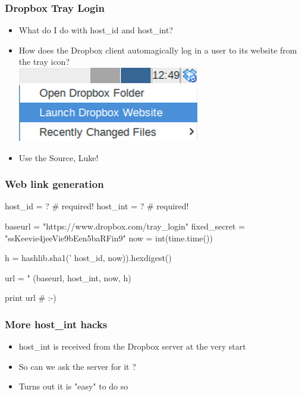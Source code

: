 \documentclass{beamer}
\newcommand\myfont{\fontsize{14}{20}\selectfont}
\begin{document}
\begin{frame}
\frametitle{Dropbox Tray Login}
\myfont
\begin{itemize}
\itemsep 2em
\item What do I do with host\_id and host\_int?
\item How does the Dropbox client automagically log in a user to its website from the tray icon? \\
\vspace{1em} \includegraphics[scale=0.5]{dbicon.png}
\item Use the Source, Luke!
\end{itemize}
\end{frame}

\begin{frame}[fragile]
\frametitle{Web link generation}
\begin{python}
host_id = ?   # required!
host_int = ?  # required!

baseurl = "https://www.dropbox.com/tray_login"
fixed_secret = "ssKeevie4jeeVie9bEen5baRFin9"
now = int(time.time())

h = hashlib.sha1('%
       host_id, now)).hexdigest()

url = "%
        (baseurl, host_int, now, h)

print url # :-)
\end{python}
\end{frame}

\begin{frame}
\frametitle{More host\_int hacks}
\myfont
\begin{itemize}
\itemsep 3em
\item host\_int is received from the Dropbox server at the very start

\item So can we ask the server for it ?

\item Turns out it is "easy" to do so
\end{itemize}
\end{frame}
\end{document}
